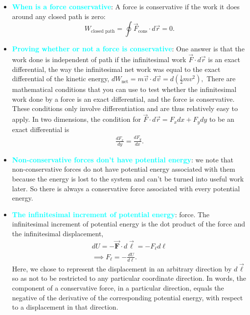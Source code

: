 \documentclass{report}
\begin{document}
\begin{itemize}
        \item \textbf{\textcolor{cyan}{When is a force conservative}}:
        A force is conservative if the work it does around any closed path is zero:
        \[
            W_{\text{closed path}} = \oint \vec{F}_{\text{cons}} \cdot d\vec{r} = 0.
        \]
        \item \textbf{\textcolor{cyan}{Proving whether or not a force is conservative}}:
            One answer is that the work done is independent of path if the infinitesimal work $\vec{F} \cdot d\vec{r}$ is an exact differential, the way the infinitesimal net work was equal to the exact differential of the kinetic energy, $dW_{\text{net}} = m\vec{v} \cdot d\vec{v} = d\left(\frac{1}{2}mv^2\right),$
            \bigbreak \noindent 
            There are mathematical conditions that you can use to test whether the infinitesimal work done by a force is an exact differential, and the force is conservative. These conditions only involve differentiation and are thus relatively easy to apply. In two dimensions, the condition for $\vec{F} \cdot d\vec{r} = F_x dx + F_y dy$ to be an exact differential is
            \begin{align*}
                \frac{dF_{x}}{dy} = \frac{dF_{y}}{dx}
            .\end{align*}
    \item \textbf{\textcolor{cyan}{Non-conservative forces don't have potential energy}}: we note that non-conservative forces do not have potential energy associated with them because the energy is lost to the system and can’t be turned into useful work later. So there is always a conservative force associated with every potential energy.
    \item \textbf{\textcolor{cyan}{The infinitesimal increment of potential energy}}:
        force. The infinitesimal increment of potential energy is the dot product of the force and the infinitesimal displacement,
        \begin{align*}
            dU = -\vec{\mathbf{F}} \cdot d\vec{\mathbf{\ell}} = -F_{\ell}d\ell \\
            \implies F_{\ell} = - \frac{dU}{d\ell}
        .\end{align*}
        \bigbreak \noindent 
        Here, we chose to represent the displacement in an arbitrary direction by  $d\vec{\mathbf{\ell}}$ so as not to be restricted to any particular coordinate direction.
        \bigbreak \noindent 
        In words, the component of a conservative force, in a particular direction, equals the negative of the derivative of the corresponding potential energy, with respect to a displacement in that direction.

\end{itemize}
\end{document}
